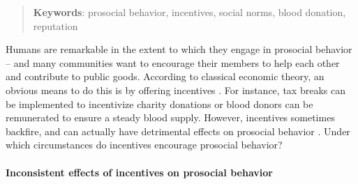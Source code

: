 \documentclass[AER]{AEA}
\begin{document}
\begin{abstract}

\vspace{0.1cm}

\textbf{Keywords}: {\normalfont prosocial behavior, incentives, social norms, blood donation, reputation}
\end{abstract}


\maketitle

Humans are remarkable in the extent to which they engage in prosocial behavior -- and many communities want to encourage their members to help each other and contribute to public goods. According to classical economic theory, an obvious means to do this is by offering incentives \citep{mill_principles_1882}. For instance, tax breaks can be implemented to incentivize charity donations or blood donors can be remunerated to ensure a steady blood supply. However, incentives sometimes backfire, and can actually have detrimental effects on prosocial behavior \citep{deci_effects_1971, gneezy_pay_2000, gneezy_fine_2000}. Under which circumstances do incentives encourage prosocial behavior?


\paragraph{Inconsistent effects of incentives on prosocial behavior}
\end{document}

